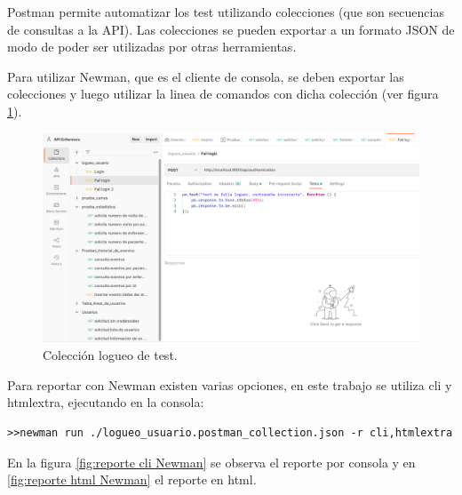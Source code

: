 Postman permite automatizar los test utilizando colecciones (que son secuencias de consultas a la API). Las colecciones se pueden exportar a un formato JSON de modo de poder ser utilizadas por otras herramientas.

Para utilizar Newman, que es el cliente de consola, se deben exportar las colecciones y luego utilizar la linea de comandos con dicha colección (ver figura \ref{fig:Colección logueo usuario en Postman}).


\begin{figure}[ht]
	\centering
	\includegraphics[scale=.25]{./Figures/Postman.png}
	\caption{Colección logueo de test.}
	\label{fig:Colección logueo usuario en Postman}
\end{figure}

Para reportar con Newman existen varias opciones, en este trabajo se utiliza cli y htmlextra, ejecutando en la consola:



\begin{lstlisting}[label=cod:Newman,caption=  Ejecución de Newman en consola]
>>newman run ./logueo_usuario.postman_collection.json -r cli,htmlextra
\end{lstlisting}
\pagebreak


En la figura \ref{fig:reporte cli Newman} se observa el reporte por consola y en \ref{fig:reporte html Newman} el reporte en html.


